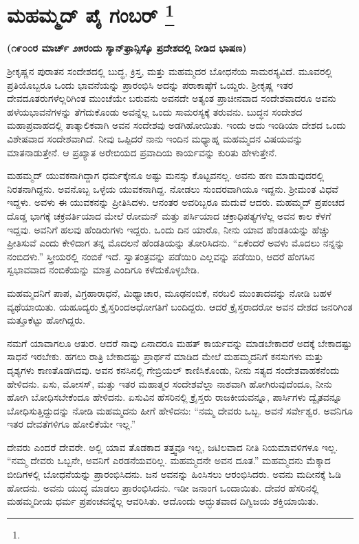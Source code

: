 
\chapter[ಮಹಮ್ಮದ್ ಪೈ ಗಂಬರ್ ]{ಮಹಮ್ಮದ್ ಪೈ ಗಂಬರ್ \protect\footnote{}}

\centerline{\textbf{(೧೯೦೦ರ ಮಾರ್ಚ್​ ೨೫ರಂದು ಸ್ಯಾನ್​ಫ್ರಾನ್ಸಿಸ್ಕೊ ಪ್ರದೇಶದಲ್ಲಿ ನೀಡಿದ ಭಾಷಣ)}}

ಶ‍್ರೀಕೃಷ್ಣನ ಪುರಾತನ ಸಂದೇಶದಲ್ಲಿ ಬುದ್ಧ, ಕ್ರಿಸ್ತ, ಮತ್ತು ಮಹಮ್ಮದರ ಬೋಧನೆಯ ಸಾಮರಸ್ಯವಿದೆ. ಮೂವರಲ್ಲಿ ಪ್ರತಿಯೊಬ್ಬರೂ ಒಂದು ಭಾವನೆಯನ್ನು ಪ್ರಾರಂಭಿಸಿ ಅದನ್ನು ಪರಾಕಾಷ್ಠೆಗೆ ಒಯ್ದರು. ಶ‍್ರೀಕೃಷ್ಣ ಇತರ ದೇವದೂತರುಗಳೆಲ್ಲರಿಗಿಂತ ಮುಂಚೆಯೇ ಬರುವನು ಅವನದೇ ಅತ್ಯಂತ ಪ್ರಾಚೀನವಾದ ಸಂದೇಶವಾದರೂ ಅವನು ಹಳೆಯ\break ಭಾವನೆಗಳನ್ನು ತೆಗೆದುಕೊಂಡು ಅವನ್ನೆಲ್ಲ ಒಂದು ಸಾಮರಸ್ಯಕ್ಕೆ ತರುವನು. ಬುದ್ಧನ ಸಂದೇಶದ ಮಹಾಪ್ರವಾಹದಲ್ಲಿ ತಾತ್ಕಾಲಿಕವಾಗಿ ಅವನ ಸಂದೇಶವು ಅಡಗಿಹೋಯಿತು. ಇಂದು ಅದು ಇಂಡಿಯಾ ದೇಶದ ಒಂದು ವಿಶೇಷವಾದ ಸಂದೇಶವಾಗಿದೆ. ನೀವು ಒಪ್ಪಿದರೆ ನಾನು ಇಂದಿನ ಮಧ್ಯಾಹ್ನ ಮಹಮ್ಮದನ ವಿಷಯವನ್ನು ಮಾತನಾಡುತ್ತೇನೆ. ಆ ಪ್ರಖ್ಯಾತ ಅರೇಬಿಯದ ಪ್ರವಾದಿಯ ಕಾರ್ಯವನ್ನು ಕುರಿತು ಹೇಳುತ್ತೇನೆ.

ಮಹಮ್ಮದ್​ ಯುವಕನಾಗಿದ್ದಾಗ ಧರ್ಮಕ್ಕೇನೂ ಅಷ್ಟು ಮನಸ್ಸು ಕೊಟ್ಟವನಲ್ಲ. ಅವನು ಹಣ ಮಾಡುವುದರಲ್ಲಿ ನಿರತನಾಗಿದ್ದನು. ಅವನೊಬ್ಬ ಒಳ್ಳೆಯ ಯುವಕನಾಗಿದ್ದ. ನೋಡಲು ಸುಂದರವಾಗಿಯೂ ಇದ್ದನು. ಶ‍್ರೀಮಂತ ವಿಧವೆ ಇದ್ದಳು. ಅವಳು ಈ ಯುವಕನನ್ನು ಪ್ರೀತಿಸಿದಳು. ಆನಂತರ ಅವರಿಬ್ಬರೂ ಮದುವೆ ಆದರು. ಮಹಮ್ಮದ್​ ಪ್ರಪಂಚದ ದೊಡ್ಡ ಭಾಗಕ್ಕೆ ಚಕ್ರವರ್ತಿಯಾದ ಮೇಲೆ ರೋಮನ್​ ಮತ್ತು ಪರ್ಸಿಯಾದ ಚಕ್ರಾಧಿಪತ್ಯಗಳೆಲ್ಲ ಅವನ ಕಾಲ ಕೆಳಗೆ ಇದ್ದವು. ಅವನಿಗೆ ಹಲವು ಹೆಂಡಿರುಗಳು ಇದ್ದರು. ಒಂದು ದಿನ ಯಾರೊ, ನೀನು ಯಾವ ಹೆಂಡತಿಯನ್ನು ಹೆಚ್ಚು ಪ್ರೀತಿಸುವೆ ಎಂದು ಕೇಳಿದಾಗ ತನ್ನ ಮೊದಲನೆ ಹೆಂಡತಿಯನ್ನು ತೋರಿಸಿದನು. “ಏಕೆಂದರೆ ಅವಳು ಮೊದಲು ನನ್ನನ್ನು ನಂಬಿದಳು.” ಸ್ತ್ರೀಯರಲ್ಲಿ ನಂಬಿಕೆ ಇದೆ. ಸ್ವಾತಂತ್ರವನ್ನು ಪಡೆಯಿರಿ ಎಲ್ಲವನ್ನು ಪಡೆಯಿರಿ, ಆದರೆ ಹೆಂಗಸಿನ ಸ್ವಭಾವವಾದ ನಂಬಿಕೆಯನ್ನು ಮಾತ್ರ ಎಂದಿಗೂ ಕಳೆದುಕೊಳ್ಳಬೇಡಿ.

ಮಹಮ್ಮದನಿಗೆ ಪಾಪ, ವಿಗ್ರಹಾರಾಧನೆ, ಮಿಥ್ಯಾಚಾರ, ಮೂಢನಂಬಿಕೆ, ನರಬಲಿ ಮುಂತಾದವನ್ನು ನೋಡಿ ಬಹಳ ವ್ಯಥೆಯಾಯಿತು. ಯಹೂದ್ಯರು ಕ್ರೈಸ್ತರಿಂದ\break ಅಧೋಗತಿಗೆ ಬಂದಿದ್ದರು. ಆದರೆ ಕ್ರೈಸ್ತರಾದರೋ ಅವನ ದೇಶದ ಜನರಿಗಿಂತ ಮತ್ತೂ\break ಕೆಟ್ಟು ಹೋಗಿದ್ದರು.

ನಮಗೆ ಯಾವಾಗಲೂ ಆತುರ. ಆದರೆ ನಾವು ಏನಾದರೂ ಮಹತ್​ ಕಾರ್ಯವನ್ನು ಮಾಡಬೇಕಾದರೆ ಅದಕ್ಕೆ ಬೇಕಾದಷ್ಟು ಸಾಧನೆ ಇರಬೇಕು. ಹಗಲು ರಾತ್ರಿ ಬೇಕಾದಷ್ಟು ಪ್ರಾರ್ಥನೆ ಮಾಡಿದ ಮೇಲೆ ಮಹಮ್ಮದನಿಗೆ ಕನಸುಗಳು ಮತ್ತು ದೃಶ್ಯಗಳು ಕಾಣತೊಡಗಿದವು. ಅವನ ಕನಸಿನಲ್ಲಿ ಗೇಬ್ರಿಯಲ್​ ಕಾಣಿಸಿಕೊಂಡು, ನೀನು ಸತ್ಯದ ಸಂದೇಶವಾಹಕನೆಂದು ಹೇಳಿದನು. ಏಸು, ಮೋಸಸ್​, ಮತ್ತು ಇತರ ಮಹಾತ್ಮರ ಸಂದೇಶವೆಲ್ಲಾ ನಾಶವಾಗಿ ಹೋಗಿರುವುದೆಂದೂ, ನೀನು ಹೋಗಿ ಬೋಧಿಸಬೇಕೆಂದೂ ಹೇಳಿದನು. ಏಸುವಿನ ಹೆಸರಿನಲ್ಲಿ ಕ್ರೈಸ್ತರು ರಾಜಕೀಯವನ್ನೂ, ಪಾರ್ಸಿಗಳು ದ್ವೈತವನ್ನೂ ಬೋಧಿಸುತ್ತಿದ್ದುದನ್ನು ನೋಡಿ ಮಹಮ್ಮದನು ಹೀಗೆ ಹೇಳಿದನು: “ನಮ್ಮ ದೇವರು ಒಬ್ಬ. ಅವನೆ ಸರ್ವೇಶ್ವರ. ಅವನಿಗೂ ಇತರ ದೇವತೆಗಳಿಗೂ ಹೋಲಿಕೆಯೇ ಇಲ್ಲ.”

ದೇವರು ಎಂದರೆ ದೇವರೇ. ಅಲ್ಲಿ ಯಾವ ತೊಡಕಾದ ತತ್ತ್ವವೂ ಇಲ್ಲ, ಜಟಿಲವಾದ ನೀತಿ ನಿಯಮಾವಳಿಗಳೂ ಇಲ್ಲ. “ನಮ್ಮ ದೇವರು ಒಬ್ಬನೇ, ಅವನಿಗೆ ಎರಡನೆಯವರಿಲ್ಲ. ಮಹಮ್ಮದನೇ ಅವನ ದೂತ.” ಮಹಮ್ಮದನು ಮೆಕ್ಕಾದ ಬೀದಿಗಳಲ್ಲಿ ಬೋಧನೆಯನ್ನು ಪ್ರಾರಂಭಿಸಿದನು. ಜನ ಅವನನ್ನು ಹಿಂಸಿಸಲು ಆರಂಭಿಸಿದರು. ಅವನು ಮದೀನಕ್ಕೆ ಓಡಿ ಹೋದನು. ಅವನು ಯುದ್ಧ ಮಾಡಲು ಪ್ರಾರಂಭಿಸಿದನು. ಇಡೀ ಜನಾಂಗ ಒಂದಾಯಿತು. ದೇವರ ಹೆಸರಿನಲ್ಲಿ ಮಹಮ್ಮದೀಯ ಧರ್ಮ ಪ್ರಪಂಚವನ್ನೆಲ್ಲ ಆವರಿಸಿತು. ಅದೊಂದು ಅದ್ಭುತವಾದ ದಿಗ್ವಿಜಯ ಶಕ್ತಿಯಾಯಿತು.

